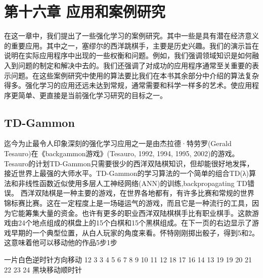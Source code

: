 \chapter{第十六章 应用和案例研究}

\begin{summary}
	在这一章中，我们提出了一些强化学习的案例研究。其中一些是具有潜在经济意义的重要应用。其中之一，塞缪尔的西洋跳棋手，主要是历史兴趣。我们的演示旨在说明在实际应用程序中出现的一些权衡和问题。例如，我们强调领域知识是如何融入到问题的制定和解决中去的。我们还强调了对成功的应用程序通常至关重要的表示问题。在这些案例研究中使用的算法要比我们在本书其余部分中介绍的算法复杂得多。强化学习的应用还远未达到常规，通常需要和科学一样多的艺术。使应用程序更简单、更直接是当前强化学习研究的目标之一。
\end{summary}


\section{TD-Gammon}
迄今为止最令人印象深刻的强化学习应用之一是由杰拉德·特劳罗(Gerald Tesauro)在《backgammon游戏》(Tesauro, 1992, 1994, 1995, 2002)的游戏。Tesauro的计划TD-Gammon只需要很少的西洋双陆棋知识，但却能很好地发挥，接近世界上最强的大师水平。TD-Gammon的学习算法的一个简单的组合TD(λ)算法和非线性函数近似使用多层人工神经网络(ANN)的训练,backpropagating TD错误。
西洋双陆棋是一种主要的游戏，在世界各地都有，有许多比赛和常规的世界锦标赛比赛。这在一定程度上是一场碰运气的游戏，而且它是一种流行的工具，因为它能筹集大量的资金。也许有更多的职业西洋双陆棋棋手比有职业棋手。这款游戏由24个地点组成的棋盘上的15个白棋和15个黑棋组成。在下一页的右边显示了游戏早期的一个典型位置，从白人玩家的角度来看。怀特刚刚掷出骰子，得到5和2。这意味着他可以移动他的作品5步1步

一片白色逆时针方向移动
12 3 3 4 5 6 7 8 9 10 11 12 18 17 16 14 13 19 19 20 21 22 23 24
   黑块移动顺时针

